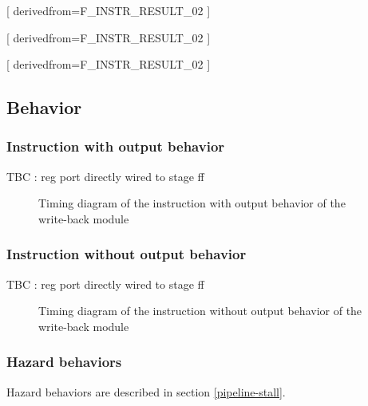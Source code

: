       [
          derivedfrom=F\_INSTR\_RESULT\_02
        ]

      [
          derivedfrom=F\_INSTR\_RESULT\_02
        ]

      [
          derivedfrom=F\_INSTR\_RESULT\_02
        ]

  \subsection{Behavior}

    \subsubsection{Instruction with output behavior}

      \begin{content}
          TBC : reg port directly wired to stage ff
        \end{content}

      \begin{figure}[H]
          \centering
          
          \caption{Timing diagram of the instruction with output behavior of the write-back module}
          \label{fig:wbm-behavior-instruction-with-output}
        \end{figure}

    \subsubsection{Instruction without output behavior}

      \begin{content}
          TBC : reg port directly wired to stage ff
        \end{content}

      \begin{figure}[H]
          \centering
          
          \caption{Timing diagram of the instruction without output behavior of the write-back module}
          \label{fig:wbm-behavior-instruction-without-output}
        \end{figure}

    \subsubsection{Hazard behaviors}

      \begin{content}
          Hazard behaviors are described in section \ref{pipeline-stall}.
        \end{content}

\newpage
